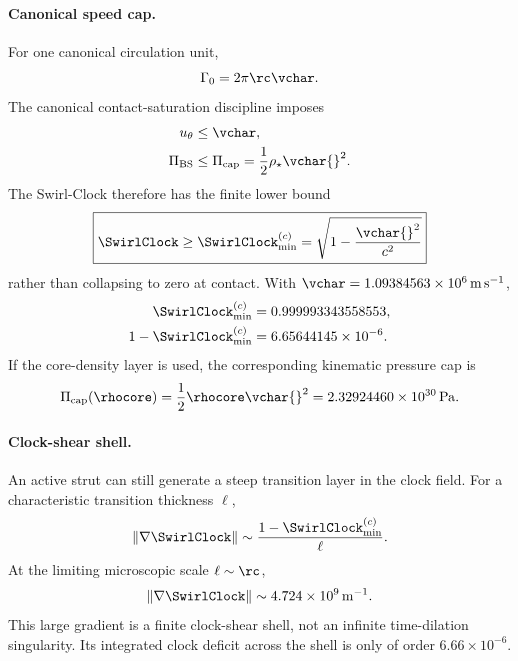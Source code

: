 \paragraph{Canonical speed cap.}
For one canonical circulation unit,
\begin{equation}
    \Gamma_0=2\pi\rc\vchar .
    \label{eq:rt_contact_gamma0_cap}
\end{equation}
The canonical contact-saturation discipline imposes
\begin{align}
    u_\theta &\le \vchar,
    \label{eq:rt_contact_speed_cap}
    \\
    \Pi_{\rm BS}
    &\le
    \Pi_{\rm cap}
    =
    \frac12\rho_\star\vchar{}^2 .
    \label{eq:rt_contact_pressure_cap}
\end{align}
The Swirl-Clock therefore has the finite lower bound
\begin{equation}
    \boxed{
    \SwirlClock
    \ge
    \SwirlClock_{\min}^{(c)}
    =
    \sqrt{1-\frac{\vchar{}^2}{c^2}}
    }
    \label{eq:rt_contact_swirl_clock_min}
\end{equation}
rather than collapsing to zero at contact.  With
\(\vchar=1.09384563\times10^6\,{\rm m\,s^{-1}}\),
\begin{align}
    \SwirlClock_{\min}^{(c)}
    &=
    0.999993343558553,
    \label{eq:rt_contact_swirl_clock_min_numeric}
    \\
    1-\SwirlClock_{\min}^{(c)}
    &=
    6.65644145\times10^{-6} .
    \label{eq:rt_contact_swirl_clock_deficit_numeric}
\end{align}
If the core-density layer is used, the corresponding kinematic pressure cap is
\begin{equation}
    \Pi_{\rm cap}(\rhocore)
    =
    \frac12\rhocore\vchar{}^2
    =
    2.32924460\times10^{30}\,{\rm Pa} .
    \label{eq:rt_contact_core_pressure_cap_numeric}
\end{equation}

\paragraph{Clock-shear shell.}
An active strut can still generate a steep transition layer in the clock field.
For a characteristic transition thickness \(\ell\),
\begin{equation}
    \lVert\nabla\SwirlClock\rVert
    \sim
    \frac{1-\SwirlClock_{\min}^{(c)}}{\ell} .
    \label{eq:rt_contact_clock_shear_shell}
\end{equation}
At the limiting microscopic scale \(\ell\sim\rc\),
\begin{equation}
    \lVert\nabla\SwirlClock\rVert
    \sim
    4.724\times10^9\,{\rm m^{-1}} .
    \label{eq:rt_contact_clock_gradient_numeric}
\end{equation}
This large gradient is a finite clock-shear shell, not an infinite
time-dilation singularity.  Its integrated clock deficit across the shell is
only of order \(6.66\times10^{-6}\).

